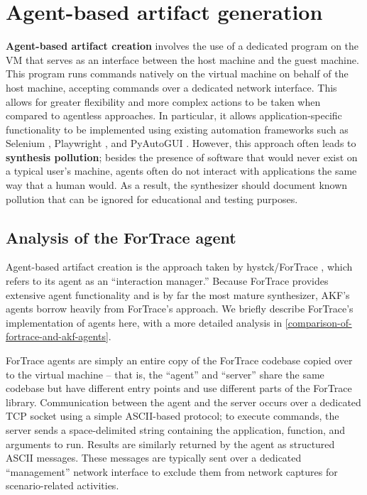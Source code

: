 \section{Agent-based artifact
generation}\label{agent-based-artifact-generation}

\textbf{Agent-based artifact creation} involves the use of a dedicated
program on the VM that serves as an interface between the host machine
and the guest machine. This program runs commands natively on the
virtual machine on behalf of the host machine, accepting commands over a
dedicated network interface. This allows for greater flexibility and
more complex actions to be taken when compared to agentless approaches.
In particular, it allows application-specific functionality to be
implemented using existing automation frameworks such as Selenium
\cite{SeleniumHQSelenium2025}, Playwright
\cite{MicrosoftPlaywrightpython2025}, and PyAutoGUI
\cite{sweigartAsweigartPyautogui2025}. However, this approach often
leads to \textbf{synthesis pollution}; besides the presence of software
that would never exist on a typical user's machine, agents often do not
interact with applications the same way that a human would. As a result,
the synthesizer should document known pollution that can be ignored for
educational and testing purposes.

\subsection{Analysis of the ForTrace
agent}\label{analysis-of-the-fortrace-agent}

Agent-based artifact creation is the approach taken by hystck/ForTrace
\cite{gobelNovelApproachGenerating2020,gobelForTraceHolisticForensic2022},
which refers to its agent as an ``interaction manager.'' Because
ForTrace provides extensive agent functionality and is by far the most
mature synthesizer, AKF's agents borrow heavily from ForTrace's
approach. We briefly describe ForTrace's implementation of agents here,
with a more detailed analysis in \autoref{comparison-of-fortrace-and-akf-agents}.

ForTrace agents are simply an entire copy of the ForTrace codebase
copied over to the virtual machine -- that is, the ``agent'' and
``server'' share the same codebase but have different entry points and
use different parts of the ForTrace library. Communication between the
agent and the server occurs over a dedicated TCP socket using a simple
ASCII-based protocol; to execute commands, the server sends a
space-delimited string containing the application, function, and
arguments to run. Results are similarly returned by the agent as
structured ASCII messages. These messages are typically sent over a
dedicated ``management'' network interface to exclude them from network
captures for scenario-related activities.

